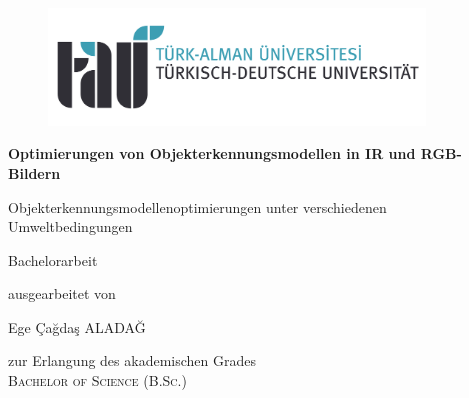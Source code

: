 \begin{titlepage}
\begin{center}

\begin{figure}[!ht]
	\centering
	\includegraphics[width=10cm]{images/tau.pdf}
\end{figure}

\vspace{0.3cm}

\begin{rmfamily}
\begin{huge}
\textbf{Optimierungen von Objekterkennungsmodellen in IR und RGB-Bildern }\\	
\end{huge}
\vspace{0.5cm}
\begin{LARGE}
Objekterkennungsmodellenoptimierungen unter verschiedenen Umweltbedingungen
\end{LARGE}
\end{rmfamily}

\vspace{0.8cm}

\begin{LARGE}
\begin{scshape}
Bachelorarbeit\\[0.8em]
\end{scshape}
\end{LARGE}

\begin{large}
ausgearbeitet von\\ 
\vspace{0.3cm}
\begin{LARGE}
Ege Çağdaş ALADAĞ\\
\end{LARGE}
\end{large}

\vspace{1.2cm}

\begin{large}
zur Erlangung des akademischen Grades\\
\vspace{0.1cm}
\textsc{Bachelor of Science (B.Sc.)}\\ 
\end{large}


\end{center}
\end{titlepage}
